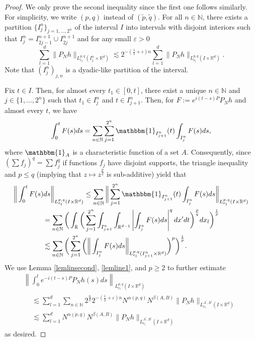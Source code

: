 \documentclass[10pt,leqno]{amsart}
\newcommand{\R}{\mathbb{R}}
\numberwithin{equation}{section}
\newcommand{\N}{\mathbb{N}}
\begin{document}
\begin{proof}
We only prove the second inequality  since the first one follows similarly.
For simplicity, we write $(p, q)$ instead of $(\tilde{p}, \tilde{q})$. 
For all $n\in \N$, there exists a partition $\{I_j^n\}_{j=1,\ldots ,2^n}$ of the interval $I$ into intervals
with disjoint interiors such that $I_j^n = I_{2j - 1}^{n + 1} \cup I_{2j}^{n+1}$ and for any small $\varepsilon > 0$
\begin{equation}
\label{lemline1}
\sum_{l=1}^d \|P_N h\|_{L_{e_l}^{p,q} (I_j^n \times \R^d)} \lesssim 2^{-(\frac{1}{2} + \varepsilon) n}\sum_{l=1}^d \|P_N h\|_{L_{e_l}^{p,q} (I \times \R^d) }.
\end{equation}
Note that $(I^n_j)_{j, n}$ is a dyadic-like partition of the interval. 

Fix $t \in I$. Then, for almost every $t_1 \in [0, t]$, there exist a unique $n\in \N$ and $j\in \{1,\ldots ,2^n\}$ such that $t_1\in I_j^n$ and $t \in I_{j+1}^n$.
Then, for $F := e^{i(t-s)P}P_N h$ and almost every $t$, we have
$$\int_0^t F(s) ds = \sum_{n\in \N} \sum_{j=1}^{2^n} \mathbbm{1}_{I^n_{j+1}}(t) \int_{I_j^n} F(s) ds, $$
where $\mathbbm{1}_{A}$ is a characteristic function of a set $A$. Consequently, since $(\sum f_j)^q = \sum f_j^q$ if 
functions $f_j$ have disjoint supports,  the triangle inequality and  $p \leq q$ (implying that $z \mapsto z^{\frac{p}{q}}$ is sub-additive) yield that  
\begin{multline*}
\bigg \|\int_0^t F(s) ds \bigg\|_{L_{e_l}^{p,q}(I \times \R^d)} \leq \sum_{n\in \N} \bigg \| \sum_{j=1}^{2^n} \mathbbm{1}_{I^n_{j+1}}(t) \int_{I^n_j} F(s) ds \bigg\|_{L_{e_l}^{p,q}(I \times \R^d)} \\
\begin{aligned}
&= \sum_{n\in \N}\bigg(\int_{\R} \bigg(\sum_{j=1}^{2^n} \int_{I_{j+1}^n} \int_{\R^{d-1}} \left|\int_{I^n_j } F(s) ds \right|^q dx^\prime dt\bigg)^{\frac{p}{q}}  dx_l \bigg)^{\frac{1}{p}}\\
&\lesssim \sum_{n\in \N} \bigg(\sum_{j=1}^{2^n} \bigg(\bigg\|\int_{I_j^n} F(s) ds \bigg\|_{L_{e_l}^{p,q} (I_{j+1}^n \times \R^d)} \bigg)^p \bigg)^{\frac{1}{p}}.
\end{aligned}
\end{multline*}
We use Lemma \ref{lemlinsecond}, \eqref{lemline1}, and $p \geq 2$  to further estimate 
\begin{multline*}
\left\|\int_0^t e^{-i(t-s) P} P_N h(s) ds \right\|_{L_{e_l}^{p,q}(I \times \R^d)}\\
\begin{aligned}
&\lesssim  \sum_{l = 1}^d \sum_{n\in \N} 2^{\frac{n}{p}} 2^{-(\frac{1}{2} + \varepsilon ) n}  N^{\alpha (p,q)} N^{\beta (A,B)} \|P_N h\|_{L_{e_l}^{A^\prime ,B^\prime}(I\times \R^d )}  \\
&\lesssim  \sum_{l = 1}^d N^{\alpha (p ,q)}  N^{\beta (A,B)} \|P_N h\|_{L_{e_l}^{A^\prime ,B^\prime} (I\times \R^d )}
\end{aligned} 
\end{multline*}
as desired.
\end{proof}
\end{document}
